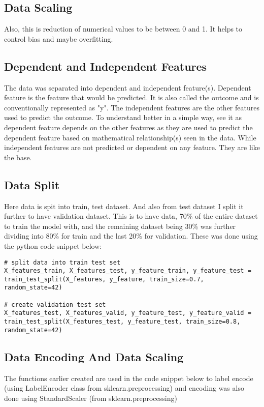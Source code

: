 \subsection{Data Scaling}
Also, this is reduction of numerical values to be between 0 and 1. It helps to control bias and maybe overfitting.

\subsection{Dependent and Independent Features}
The data was separated into dependent and independent feature(s). Dependent feature is the feature that would be predicted. It is also called the outcome and is conventionally represented as "y". The independent features are the other features used to predict the outcome. To understand better in a simple way, see it as dependent feature depends on the other features as they are used to predict the dependent feature based on mathematical relationship(s) seen in the data. While independent features are not predicted or dependent on any feature. They are like the base.

\subsection{Data Split}
Here data is spit into train, test dataset. And also from test dataset I split it further to have validation dataset. This is to have data, 70\% of the entire dataset to train the model with, and the remaining dataset being 30\% was further dividing into 80\% for train and the last 20\% for validation.
These was done using the python code snippet below:

\begin{verbatim}
# split data into train test set
X_features_train, X_features_test, y_feature_train, y_feature_test = train_test_split(X_features, y_feature, train_size=0.7, random_state=42)

# create validation test set
X_features_test, X_features_valid, y_feature_test, y_feature_valid = train_test_split(X_features_test, y_feature_test, train_size=0.8, random_state=42)
\end{verbatim}


\subsection{Data Encoding And Data Scaling}
The functions earlier created are used in the code snippet below to label encode (using LabelEncoder class from sklearn.preprocessing) and encoding was also done using StandardScaler (from sklearn.preprocessing)

